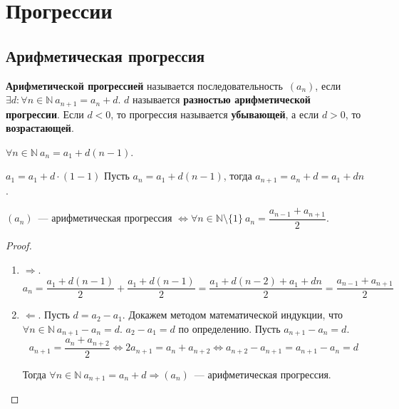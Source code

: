 \section{Прогрессии}
\subsection{Арифметическая прогрессия}
 \textbf{Арифметической прогрессией} называется последовательность~$(a_n)$, если $\exists d \colon \forall n \in \mathbb N \ a_{n+1} = a_n + d$.
$d$ называется \textbf{разностью арифметической прогрессии}.
Если $d < 0$, то прогрессия называется \textbf{убывающей}, а если $d > 0$, то \textbf{возрастающей}.

\begin{statement}
$\forall n \in \mathbb N \ a_n = a_1 + d(n - 1)$.
\end{statement}
\begin{proofmathind}
	\indbase $a_1 = a_1 + d \cdot (1 - 1)$
	\indstep Пусть $a_n = a_1 + d(n - 1)$, тогда $a_{n+1} = a_n + d = a_1 + dn$. \indend
\end{proofmathind}

\begin{theorem}
$(a_n)$~--- арифметическая прогрессия $\Leftrightarrow \forall n \in \mathbb N \setminus \{ 1 \} \ a_n = \dfrac{a_{n-1} + a_{n+1}}2$.
\end{theorem}
\begin{proof}
\begin{enumerate}
	\item $\Rightarrow$.
	\begin{equation*}
	a_n = \frac{a_1 + d(n - 1)}2 + \frac{a_1 + d(n - 1)}2 =
	\frac{a_1 + d(n - 2) + a_1 + dn}2 =
	\frac{a_{n-1} + a_{n+1}}2
	\end{equation*}
	
	\item $\Leftarrow$. Пусть $d = a_2 - a_1$.
	Докажем методом математической индукции, что $\forall n \in \mathbb N \ a_{n+1} - a_n = d$.
		\indbase $a_2 - a_1 = d$ по определению.
		\indstep Пусть $a_{n+1} - a_n = d$.
		\begin{equation*}
		a_{n+1} = \frac{a_n + a_{n+2}}2 \Leftrightarrow
		2 a_{n+1} = a_n + a_{n+2} \Leftrightarrow
		a_{n+2} - a_{n+1} = a_{n+1} - a_n = d
		\end{equation*}
		\indend
		
	Тогда $\forall n \in \mathbb N \ a_{n+1} = a_n + d \Rightarrow (a_n)$~--- арифметическая прогрессия.
\end{enumerate}
\end{proof}

